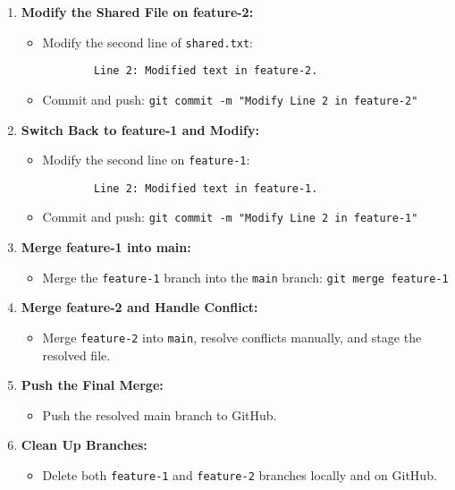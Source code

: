 \documentclass[a4paper,12pt]{article}
\begin{document}
\begin{enumerate}[label=\arabic*.]
    \item \textbf{Modify the Shared File on feature-2:}
    \begin{itemize}
        \item Modify the second line of \texttt{shared.txt}:
        \begin{verbatim}
        Line 2: Modified text in feature-2.
        \end{verbatim}
        \item Commit and push: \texttt{git commit -m "Modify Line 2 in feature-2"}
    \end{itemize}

    \item \textbf{Switch Back to feature-1 and Modify:}
    \begin{itemize}
        \item Modify the second line on \texttt{feature-1}:
        \begin{verbatim}
        Line 2: Modified text in feature-1.
        \end{verbatim}
        \item Commit and push: \texttt{git commit -m "Modify Line 2 in feature-1"}
    \end{itemize}

    \item \textbf{Merge feature-1 into main:}
    \begin{itemize}
        \item Merge the \texttt{feature-1} branch into the \texttt{main} branch: \texttt{git merge feature-1}
    \end{itemize}

    \item \textbf{Merge feature-2 and Handle Conflict:}
    \begin{itemize}
        \item Merge \texttt{feature-2} into \texttt{main}, resolve conflicts manually, and stage the resolved file.
    \end{itemize}

    \item \textbf{Push the Final Merge:}
    \begin{itemize}
        \item Push the resolved main branch to GitHub.
    \end{itemize}

    \item \textbf{Clean Up Branches:}
    \begin{itemize}
        \item Delete both \texttt{feature-1} and \texttt{feature-2} branches locally and on GitHub.
    \end{itemize}
\end{enumerate}
\end{document}
